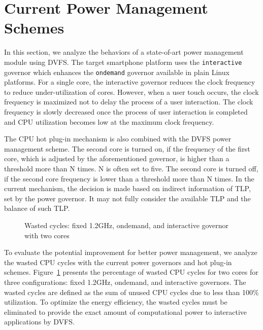 \section{Current Power Management Schemes}

In this section, we analyze the behaviors of a state-of-art power management module using DVFS.
The target smartphone platform uses the {\tt interactive} governor which enhances the {\tt ondemand} governor
available in plain Linux platforms. For a single core, the interactive governor reduces the clock
frequency to reduce under-utilization of cores. However, when a user touch occurs, the clock frequency
is maximized not to delay the process of a user interaction. The clock frequency is slowly decreased once
the process of user interaction is completed and CPU utilization becomes low at the maximum clock frequency.

The CPU hot plug-in mechanism is also combined with the DVFS power management scheme. The second core is turned on,
if the frequency of the first core, which is adjusted by the aforementioned governor, is higher 
than a threshold more than N times. N is often set to five. The second core is turned off, if the second core 
frequency is lower than a threshold more than N times. In the current mechanism, the decision is made based
on indirect information of TLP, set by the power governor. It may not fully consider the available
TLP and the balance of such TLP.

\begin{figure}[bt]
\begin{center}
\vspace{-0.2in}
\end{center}
\caption{Wasted cycles: fixed 1.2GHz, ondemand, and interactive governor with two cores}
\vspace{-0.2in}
\label{fig:wasted_cycles}
\end{figure}

To evaluate the potential improvement for better power management, we analyze the wasted CPU cycles with
the current power governors and hot plug-in schemes. Figure~\ref{fig:wasted_cycles} presents the
percentage of wasted CPU cycles for two cores for three configurations: fixed 1.2GHz, ondemand,
and interactive governors. The wasted cycles are defined as the sum of unused CPU cycles due to
less than 100\% utilization. To optimize the energy efficiency, the wasted cycles must be
eliminated to provide the exact amount of computational power to interactive applications by
DVFS.  

